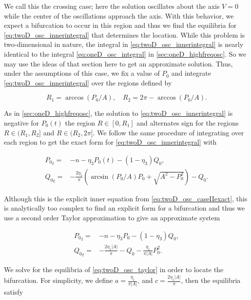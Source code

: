 We call this the crossing case; here the solution oscillates about the axis $V=0$ while the center of the oscillations approach the axis. With this behavior, we expect a bifurcation to occur in this region and thus we find the equilibria for \eqref{eq:twoD_osc_innerintegral} that determines the location. While this problem is two-dimensional in nature, the integral in \eqref{eq:twoD_osc_innerintegral} is nearly identical to the integral \eqref{eq:oneD_osc_integral} in \autoref{sec:oneD_highfreqosc}. So we may use the ideas of that section here to get an approximate solution. Thus, under the assumptions of this case, we fix a value of $P_0$ and integrate \eqref{eq:twoD_osc_innerintegral} over the regions defined by

\begin{equation*}
R_1=\arccos(P_0/A),\quad R_2=2\pi-\arccos(P_0/A).
\end{equation*}

As in \autoref{sec:oneD_highfreqosc}, the solution to \eqref{eq:twoD_osc_innerintegral} is negative for $P_0(t)$ the region $R\in[0,R_1]$ and alternates sign for the regions $R\in (R_1,R_2]$ and $R\in (R_2,2\pi]$. We follow the same procedure of integrating over each region to get the exact form for \eqref{eq:twoD_osc_innerintegral} with

\begin{equation}\label{eq:twoD_osc_caseIIexact}
\begin{aligned}
{P_0}_t=&-n- \eta_3 P_0(t)-(1-\eta_3)Q_0,\\
{Q_0}_t=&-\frac{2\eta_1}{\pi}\left(\arcsin(P_0/A)P_0+\sqrt{A^2-P_0^2}\right)-Q_0.
\end{aligned}
\end{equation}

Although this is the explicit inner equation from \eqref{eq:twoD_osc_caseIIexact}, this is analytically too complex to find an explicit form for a bifurcation and thus we use a second order Taylor approximation to give an approximate system

\begin{equation}\label{eq:twoD_osc_taylor}
\begin{aligned}
{P_0}_t=&-n -\eta_3 P_0-(1-\eta_3)Q_0,\\
{Q_0}_t=&-\frac{2\eta_1|A|}{\pi}-Q_0-\frac{\eta_1}{\pi|A|}P_0^2.
\end{aligned}
\end{equation}

We solve for the equilibria of \eqref{eq:twoD_osc_taylor} in order to locate the bifurcation. For simplicity, we define $a=\frac{\eta_1}{\pi|A|}$, and $ c=\frac{2\eta_1|A|}{\pi}$, then the equilibria satisfy

